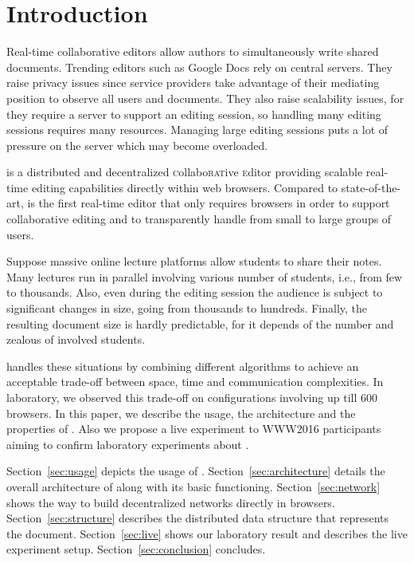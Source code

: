 
\section{Introduction}
\label{sec:introduction}

Real-time collaborative editors allow authors to simultaneously write shared
documents. Trending editors such as Google Docs rely on central servers. They
raise privacy issues since service providers take advantage of their mediating
position to observe all users and documents. They also raise scalability issues,
for they require a server to support an editing session, so handling many
editing sessions requires many resources. Managing large editing sessions puts a
lot of pressure on the server which may become overloaded.

\CRATE is a distributed and decentralized \textsc{c}ollabo\textsc{rat}ive
\textsc{e}ditor providing scalable real-time editing capabilities directly
within web browsers. Compared to state-of-the-art, \CRATE is the first real-time
editor that only requires browsers in order to support collaborative editing and
to transparently handle from small to large groups of users.

Suppose massive online lecture platforms allow students to share their
notes. Many lectures run in parallel involving various number of students, i.e.,
from few to thousands. Also, even during the editing session the audience is subject
to significant changes in size, going from thousands to hundreds. Finally, the
resulting document size is hardly predictable, for it depends of the number and
zealous of involved students.

\CRATE handles these situations by combining different algorithms to achieve an
acceptable trade-off between space, time and communication complexities. In
laboratory, we observed this trade-off on configurations involving up till 600
browsers. In this paper, we describe the usage, the architecture and the
properties of \CRATE. Also we propose a live experiment to WWW2016 participants
aiming to confirm laboratory experiments about \CRATE.

Section~\ref{sec:usage} depicts the usage of \CRATE.
Section~\ref{sec:architecture} details the overall architecture of \CRATE along
with its basic functioning. Section~\ref{sec:network} shows the way to build
decentralized networks directly in browsers.  Section~\ref{sec:structure}
describes the distributed data structure that represents the document.
Section~\ref{sec:live} shows our laboratory result and describes the live
experiment setup. Section~\ref{sec:conclusion} concludes.



